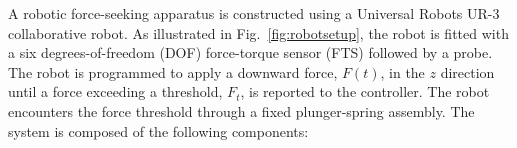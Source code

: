 A robotic force-seeking apparatus is constructed using a Universal Robots UR-3 collaborative robot.  As illustrated in Fig.~\ref{fig:robotsetup}, the robot is fitted with a six degrees-of-freedom (DOF) force-torque sensor (FTS) followed by a probe.  The robot is programmed to apply a downward force, $F(t)$, in the $z$ direction until a force exceeding a threshold, $F_t$, is reported to the controller.  The robot encounters the force threshold through a fixed plunger-spring assembly. 
The system is composed of the following components:
